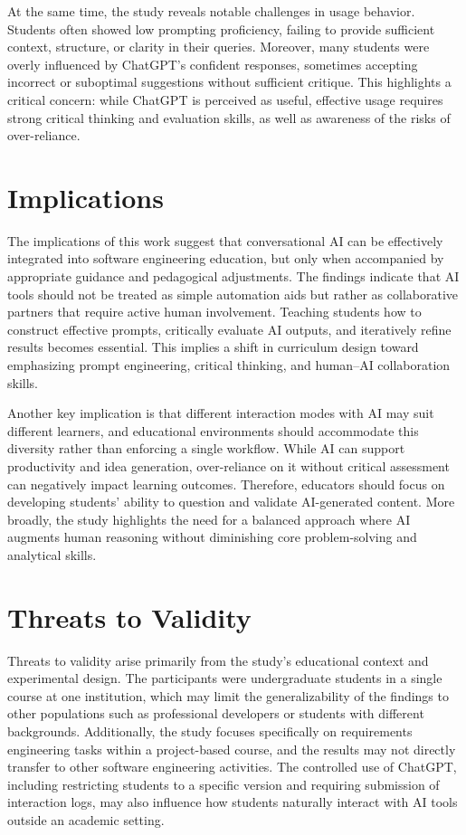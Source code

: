 At the same time, the study reveals notable challenges in usage behavior. Students often showed low prompting proficiency, failing to provide sufficient context, structure, or clarity in their queries. Moreover, many students were overly influenced by ChatGPT's confident responses, sometimes accepting incorrect or suboptimal suggestions without sufficient critique. This highlights a critical concern: while ChatGPT is perceived as useful, effective usage requires strong critical thinking and evaluation skills, as well as awareness of the risks of over-reliance.

\section{Implications}
The implications of this work suggest that conversational AI can be effectively integrated into software engineering education, but only when accompanied by appropriate guidance and pedagogical adjustments. The findings indicate that AI tools should not be treated as simple automation aids but rather as collaborative partners that require active human involvement. Teaching students how to construct effective prompts, critically evaluate AI outputs, and iteratively refine results becomes essential. This implies a shift in curriculum design toward emphasizing prompt engineering, critical thinking, and human–AI collaboration skills.

Another key implication is that different interaction modes with AI may suit different learners, and educational environments should accommodate this diversity rather than enforcing a single workflow. While AI can support productivity and idea generation, over-reliance on it without critical assessment can negatively impact learning outcomes. Therefore, educators should focus on developing students’ ability to question and validate AI-generated content. More broadly, the study highlights the need for a balanced approach where AI augments human reasoning without diminishing core problem-solving and analytical skills.

\section{Threats to Validity}
Threats to validity arise primarily from the study’s educational context and experimental design. The participants were undergraduate students in a single course at one institution, which may limit the generalizability of the findings to other populations such as professional developers or students with different backgrounds. Additionally, the study focuses specifically on requirements engineering tasks within a project-based course, and the results may not directly transfer to other software engineering activities. The controlled use of ChatGPT, including restricting students to a specific version and requiring submission of interaction logs, may also influence how students naturally interact with AI tools outside an academic setting.

